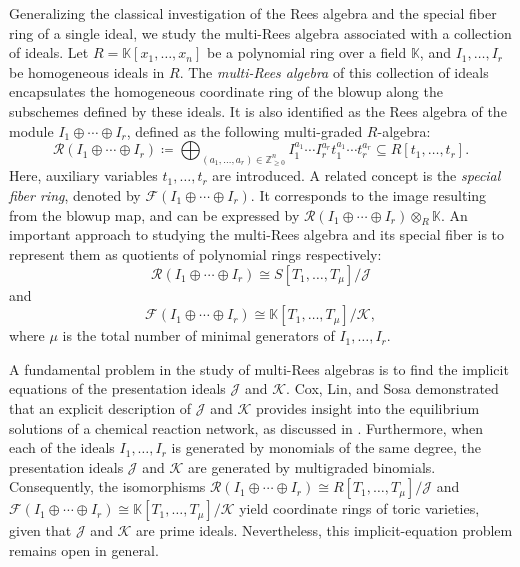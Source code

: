 \documentclass[11pt,a4paper,reqno,dvipsnames]{amsart}
\theoremstyle{plain}
\theoremstyle{definition}
\newtheorem{Assumptions and Discussion}[Theorem]{Assumptions and Discussion}
\theoremstyle{remark}
\def\KK{{\mathbb K}}
\begin{document}
Generalizing the classical investigation of the Rees algebra and the special fiber ring of a single ideal, we study the multi-Rees algebra associated with a collection of ideals.
Let $R=\KK[x_1,\ldots,x_n]$ be a polynomial ring over a field $\KK$, and
$ I_1, \ldots, I_r$ be homogeneous ideals in $R$.
The \emph{multi-Rees algebra} of this collection of ideals encapsulates the homogeneous coordinate ring of the blowup along the subschemes defined by these ideals. It is also identified as the Rees algebra of the module $I_1 \oplus \cdots \oplus I_r$, defined as the following multi-graded $R$-algebra:
\[
    \mathcal{R} (I_1 \oplus \cdots \oplus I_r) \coloneqq \bigoplus_{(a_1, \ldots, a_r) \in \mathbb{Z}_{\geq 0}^n} I_1^{a_1} \cdots I_r^{a_r}t_1^{a_1}\cdots t_r^{a_r} \subseteq R[t_1,\ldots, t_r].
\]
Here, auxiliary variables $t_1, \ldots, t_r$ are introduced. A related concept is the \emph{special fiber ring}, denoted by $\mathcal{F}(I_1 \oplus \cdots \oplus I_r)$. It corresponds to the image resulting from the blowup map, and can be expressed by $\mathcal{R}(I_1 \oplus \cdots \oplus I_r) \otimes_{R}\mathbb{K}$.
An important approach to studying the multi-Rees algebra and its special fiber is to represent them as quotients of polynomial rings respectively:
\[
    \mathcal{R} (I_1 \oplus \cdots \oplus I_r) \cong S[T_1,\ldots, T_\mu]/\mathcal{J}
\]
and
\[
    \mathcal{F} (I_1 \oplus \cdots \oplus I_r) \cong \mathbb{K}[T_1,\ldots, T_\mu]/\mathcal{K},
\]
where $\mu$ is the total number of minimal generators of $I_1, \ldots, I_r$.

A fundamental problem in the study of multi-Rees algebras is to find the implicit equations of the presentation ideals $\mathcal{J}$ and $\mathcal{K}$. Cox, Lin, and Sosa demonstrated that an explicit description of $\mathcal{J}$ and $\mathcal{K}$ provides insight into the equilibrium solutions of a chemical reaction network, as discussed in \cite{CLS}. 
Furthermore, when each of the ideals $I_1, \ldots, I_r$ is generated by monomials of the same degree, the presentation ideals $\mathcal{J}$ and $\mathcal{K}$ are generated by multigraded binomials.
Consequently, the isomorphisms $\mathcal{R} (I_1 \oplus \cdots \oplus I_r) \cong R[T_{1},\ldots, T_{\mu}]/\mathcal{J}$ and $\mathcal{F} (I_1 \oplus \cdots \oplus I_r) \cong \mathbb{K}[T_{1},\ldots, T_{\mu}]/\mathcal{K}$ yield coordinate rings of toric varieties, given that $\mathcal{J}$ and $\mathcal{K}$ are prime ideals.
Nevertheless, this implicit-equation problem remains open in general.
\end{document}
